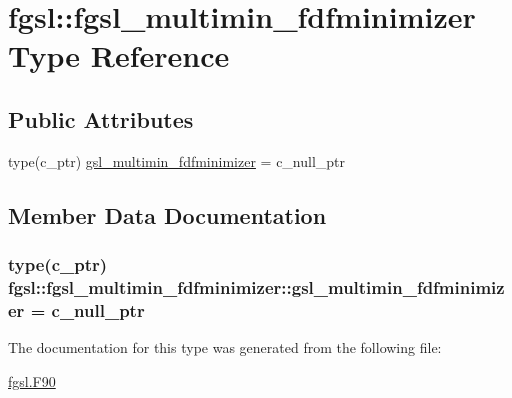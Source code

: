 \hypertarget{structfgsl_1_1fgsl__multimin__fdfminimizer}{}\section{fgsl\+:\+:fgsl\+\_\+multimin\+\_\+fdfminimizer Type Reference}
\label{structfgsl_1_1fgsl__multimin__fdfminimizer}
\subsection*{Public Attributes}
\begin{DoxyCompactItemize}
\item 
type(c\+\_\+ptr) \hyperlink{structfgsl_1_1fgsl__multimin__fdfminimizer_a02b408d8e6502743bfa179d7b62791b0}{gsl\+\_\+multimin\+\_\+fdfminimizer} = c\+\_\+null\+\_\+ptr
\end{DoxyCompactItemize}


\subsection{Member Data Documentation}
\hypertarget{structfgsl_1_1fgsl__multimin__fdfminimizer_a02b408d8e6502743bfa179d7b62791b0}{}
\subsubsection[{gsl\+\_\+multimin\+\_\+fdfminimizer}]{\setlength{\rightskip}{0pt plus 5cm}type(c\+\_\+ptr) fgsl\+::fgsl\+\_\+multimin\+\_\+fdfminimizer\+::gsl\+\_\+multimin\+\_\+fdfminimizer = c\+\_\+null\+\_\+ptr}\label{structfgsl_1_1fgsl__multimin__fdfminimizer_a02b408d8e6502743bfa179d7b62791b0}


The documentation for this type was generated from the following file\+:\begin{DoxyCompactItemize}
\item 
\hyperlink{fgsl_8F90}{fgsl.\+F90}\end{DoxyCompactItemize}

